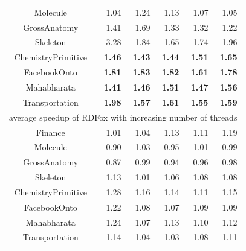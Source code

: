 \begin{table}[htb]
{\begin{tabular}{crrrrr}
Molecule&1.04&1.24&1.13&1.07&1.05\\
GrossAnatomy&1.41&1.69&1.33&1.32&1.22\\
Skeleton&3.28&1.84&1.65&1.74&1.96\\
ChemistryPrimitive&\textbf{1.46}&\textbf{1.43}&\textbf{1.44}&\textbf{1.51}&\textbf{1.65}\\
FacebookOnto&\textbf{1.81}&\textbf{1.83}&\textbf{1.82}&\textbf{1.61}&\textbf{1.78}\\
Mahabharata&\textbf{1.41}&\textbf{1.46}&\textbf{1.51}&\textbf{1.47}&\textbf{1.56}\\
Transportation&\textbf{1.98}&\textbf{1.57}&\textbf{1.61}&\textbf{1.55}&\textbf{1.59}\\
\hline
\multicolumn{6}{c}{average speedup of RDFox with increasing
  number of threads}\\%
\hline
Finance&1.01&1.04&1.13&1.11&1.19\\
Molecule&0.90&1.03&0.95&1.01&0.99\\
GrossAnatomy&0.87&0.99&0.94&0.96&0.98\\
Skeleton&1.13&1.01&1.06&1.08&1.08\\
ChemistryPrimitive&1.28&1.16&1.14&1.11&1.15\\
FacebookOnto&1.22&1.08&1.07&1.09&1.09\\
Mahabharata&1.24&1.07&1.13&1.10&1.12\\
Transportation&1.14&1.04&1.03&1.08&1.11\\
\hline
\end{tabular}
}
\end{table}
